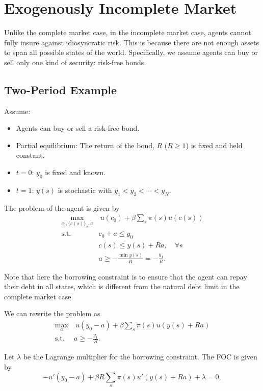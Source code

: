 \chapter{Exogenously Incomplete Market}

Unlike the complete market case, in the incomplete market case, agents cannot fully insure against idiosyncratic risk. This is because there are not enough assets to span all possible states of the world. Specifically, we assume agents can buy or sell only one kind of security: risk-free bonds.

\section{Two-Period Example}

Assume:
\begin{itemize}
    \item Agents can buy or sell a risk-free bond.
    \item Partial equilibrium: The return of the bond, $R$ ($R\ge 1$) is fixed and held constant.
    \item $t = 0$: $y_0$ is fixed and known.
    \item $t = 1$: $y(s)$ is stochastic with $y_1<y_2<\cdots<y_N$.
\end{itemize}

The problem of the agent is given by
\[
\begin{aligned}
    \max_{c_0, \{c(s)\}_{s}, a} & \ u(c_0)+\beta \sum_s\pi(s)u(c(s))\\
    \text{s.t. } & c_0 + a \le y_0\\
    & c(s) \le y(s) + Ra, \quad \forall s\\
    & a\ge -\frac{\min y(s)}{R} = -\frac{y_1}{R}.
\end{aligned}
\]

Note that here the borrowing constraint is to ensure that the agent can repay their debt in all states, which is different from the natural debt limit in the complete market case.

We can rewrite the problem as
\[
\begin{aligned}
    \max_a & \ u(y_0 - a) + \beta \sum_s\pi(s)u(y(s) + Ra)\\
    \text{s.t. } & a\ge -\frac{y_1}{R}.
\end{aligned}
\]

Let $\lambda$ be the Lagrange multiplier for the borrowing constraint. The FOC is given by
\[
-u'(y_0 - a) + \beta R \sum_s \pi(s) u'(y(s) + Ra) + \lambda = 0,
\]

